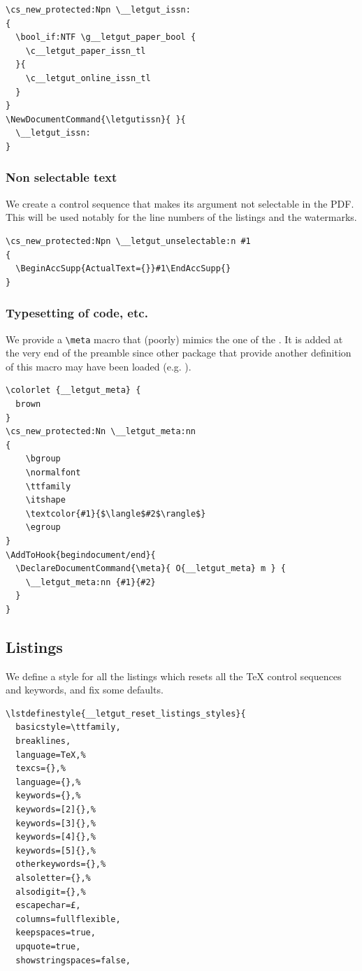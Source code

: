 \documentclass{letgut}
\begin{document}
\begin{lstlisting}
\cs_new_protected:Npn \__letgut_issn:
{
  \bool_if:NTF \g__letgut_paper_bool {
    \c__letgut_paper_issn_tl
  }{
    \c__letgut_online_issn_tl
  }
}
\NewDocumentCommand{\letgutissn}{ }{
  \__letgut_issn:
}
\end{lstlisting}

\subsubsection{Non selectable text}
\label{sec:org00f0870}

We create a control sequence that makes its argument not selectable in the
PDF. This will be used notably for the line numbers of the listings and the
watermarks.
\begin{lstlisting}
\cs_new_protected:Npn \__letgut_unselectable:n #1
{
  \BeginAccSupp{ActualText={}}#1\EndAccSupp{}
}
\end{lstlisting}

\subsubsection{Typesetting of code, etc.}
\label{sec:org371597a}

We provide a \lstinline+\meta+ macro that (poorly) mimics the one of the
. It is added at the very end of the preamble since other
package that provide another definition of this macro may have been loaded
(e.g. ).
\begin{lstlisting}
\colorlet {__letgut_meta} {
  brown
}
\cs_new_protected:Nn \__letgut_meta:nn
{
    \bgroup
    \normalfont
    \ttfamily
    \itshape
    \textcolor{#1}{$\langle$#2$\rangle$}
    \egroup
}
\AddToHook{begindocument/end}{
  \DeclareDocumentCommand{\meta}{ O{__letgut_meta} m } {
    \__letgut_meta:nn {#1}{#2}
  }
}
\end{lstlisting}

\subsection{Listings}
\label{sec:orgf79a2c2}

We define a style for all the listings which resets all the \TeX{} control
sequences and keywords, and fix some defaults.

\begin{lstlisting}
\lstdefinestyle{__letgut_reset_listings_styles}{
  basicstyle=\ttfamily,
  breaklines,
  language=TeX,%
  texcs={},%
  language={},%
  keywords={},%
  keywords=[2]{},%
  keywords=[3]{},%
  keywords=[4]{},%
  keywords=[5]{},%
  otherkeywords={},%
  alsoletter={},%
  alsodigit={},%
  escapechar=£,
  columns=fullflexible,
  keepspaces=true,
  upquote=true,
  showstringspaces=false,
\end{lstlisting}
\end{document}
